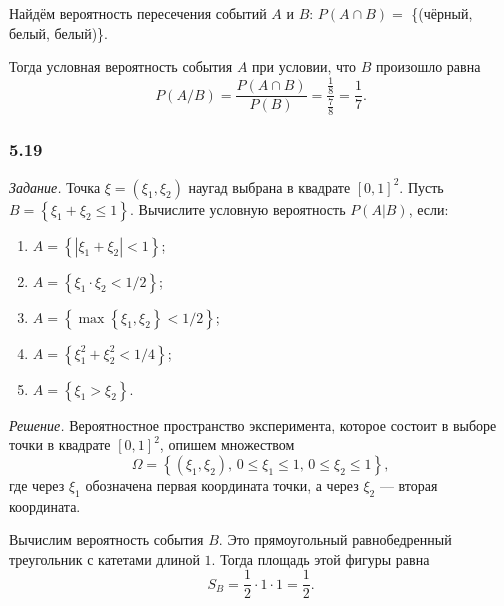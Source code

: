 Найдём вероятность пересечения событий $A$ и $B: \, P \left( A \cap B \right) =$ \{(чёрный, белый, белый)\}.

Тогда условная вероятность события $A$ при условии, что $B$ произошло равна
$$P \left( A/B \right) =
\frac{P \left( A \cap B \right) }{P \left( B \right) } =
\frac{ \frac{1}{8} }{ \frac{7}{8} } =
\frac{1}{7}.$$

\subsubsection*{5.19}

\textit{Задание.} Точка $ \xi = \left( \xi_1, \xi_2 \right) $ наугад выбрана в квадрате $ \left[ 0, 1 \right]^2$.
Пусть $B = \left\{ \xi_1 + \xi_2 \leq 1 \right\} $.
Вычислите условную вероятность $P \left( \left. A \right| B \right) $, если:
\begin{enumerate}[label=\alph*)]
\item $A = \left\{ \left| \xi_1 + \xi_2 \right| < 1 \right\} $;
\item $A = \left\{ \xi_1 \cdot \xi_2 < 1/2 \right\} $;
\item $A = \left\{ \max \left\{ \xi_1, \xi_2 \right\} < 1/2 \right\} $;
\item $A = \left\{ \xi_1^2 + \xi_2^2 < 1/4 \right\} $;
\item $A = \left\{ \xi_1 > \xi_2 \right\} $.
\end{enumerate}

\textit{Решение.}
Вероятностное пространство эксперимента,
которое состоит в выборе точки в квадрате
$ \left[ 0, 1 \right]^2$, опишем множеством
$$ \Omega =
\left\{ \left( \xi_1, \xi_2 \right), \,
0 \leq \xi_1 \leq 1, \,
0 \leq \xi_2 \leq 1 \right\},$$
где через $ \xi_1$ обозначена первая координата точки, а через $ \xi_2$ --- вторая координата.

Вычислим вероятность события $B$.
Это прямоугольный равнобедренный треугольник с катетами длиной $1$.
Тогда площадь этой фигуры равна
$$S_B =
\frac{1}{2} \cdot 1 \cdot 1 =
\frac{1}{2}.$$

